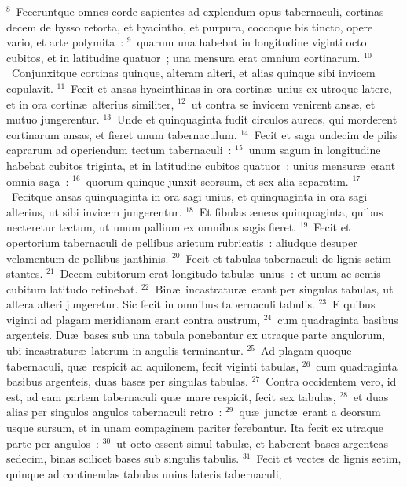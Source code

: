 ${}^{8}$~Feceruntque omnes corde sapientes ad explendum opus tabernaculi, cortinas decem de bysso retorta, et hyacintho, et purpura, coccoque bis tincto, opere vario, et arte polymita~:
${}^{9}$~quarum una habebat in longitudine viginti octo cubitos, et in latitudine quatuor~; una mensura erat omnium cortinarum.
${}^{10}$~Conjunxitque cortinas quinque, alteram alteri, et alias quinque sibi invicem copulavit.
${}^{11}$~Fecit et ansas hyacinthinas in ora cortin\ae\ unius ex utroque latere, et in ora cortin\ae\ alterius similiter,
${}^{12}$~ut contra se invicem venirent ans\ae , et mutuo jungerentur.
${}^{13}$~Unde et quinquaginta fudit circulos aureos, qui morderent cortinarum ansas, et fieret unum tabernaculum.
${}^{14}$~Fecit et saga undecim de pilis caprarum ad operiendum tectum tabernaculi~:
${}^{15}$~unum sagum in longitudine habebat cubitos triginta, et in latitudine cubitos quatuor~: unius mensur\ae\ erant omnia saga~:
${}^{16}$~quorum quinque junxit seorsum, et sex alia separatim.
${}^{17}$~Fecitque ansas quinquaginta in ora sagi unius, et quinquaginta in ora sagi alterius, ut sibi invicem jungerentur.
${}^{18}$~Et fibulas \ae neas quinquaginta, quibus necteretur tectum, ut unum pallium ex omnibus sagis fieret.
${}^{19}$~Fecit et opertorium tabernaculi de pellibus arietum rubricatis~: aliudque desuper velamentum de pellibus janthinis.
${}^{20}$~Fecit et tabulas tabernaculi de lignis setim stantes.
${}^{21}$~Decem cubitorum erat longitudo tabul\ae\ unius~: et unum ac semis cubitum latitudo retinebat.
${}^{22}$~Bin\ae\ incastratur\ae\ erant per singulas tabulas, ut altera alteri jungeretur. Sic fecit in omnibus tabernaculi tabulis.
${}^{23}$~E quibus viginti ad plagam meridianam erant contra austrum,
${}^{24}$~cum quadraginta basibus argenteis. Du\ae\ bases sub una tabula ponebantur ex utraque parte angulorum, ubi incastratur\ae\ laterum in angulis terminantur.
${}^{25}$~Ad plagam quoque tabernaculi, qu\ae\ respicit ad aquilonem, fecit viginti tabulas,
${}^{26}$~cum quadraginta basibus argenteis, duas bases per singulas tabulas.
${}^{27}$~Contra occidentem vero, id est, ad eam partem tabernaculi qu\ae\ mare respicit, fecit sex tabulas,
${}^{28}$~et duas alias per singulos angulos tabernaculi retro~:
${}^{29}$~qu\ae\ junct\ae\ erant a deorsum usque sursum, et in unam compaginem pariter ferebantur. Ita fecit ex utraque parte per angulos~:
${}^{30}$~ut octo essent simul tabul\ae , et haberent bases argenteas sedecim, binas scilicet bases sub singulis tabulis.
${}^{31}$~Fecit et vectes de lignis setim, quinque ad continendas tabulas unius lateris tabernaculi,
